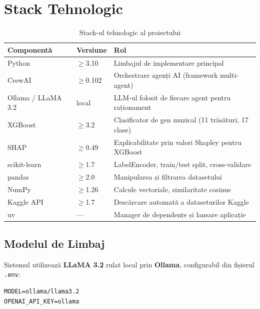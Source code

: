 \documentclass[12pt,a4paper]{report}
\begin{document}
\chapter{Stack Tehnologic}

\begin{table}[H]
\centering
\renewcommand{\arraystretch}{1.3}
\begin{tabularx}{\textwidth}{@{}llX@{}}
\toprule
\textbf{Componentă} & \textbf{Versiune} & \textbf{Rol} \\
\midrule
Python          & $\geq$3.10   & Limbajul de implementare principal \\
CrewAI          & $\geq$0.102  & Orchestrare agenți AI (framework multi-agent) \\
Ollama / LLaMA 3.2 & local     & LLM-ul folosit de fiecare agent pentru raționament \\
XGBoost         & $\geq$3.2    & Clasificator de gen muzical (11 trăsături, 17 clase) \\
SHAP            & $\geq$0.49   & Explicabilitate prin valori Shapley pentru XGBoost \\
scikit-learn    & $\geq$1.7    & LabelEncoder, train/test split, cross-validare \\
pandas          & $\geq$2.0    & Manipularea și filtrarea datasetului \\
NumPy           & $\geq$1.26   & Calcule vectoriale, similaritate cosinus \\
Kaggle API      & $\geq$1.7    & Descărcare automată a dataseturilor Kaggle \\
uv              & —            & Manager de dependențe și lansare aplicație \\
\bottomrule
\end{tabularx}
\caption{Stack-ul tehnologic al proiectului}
\label{tab:techstack}
\end{table}

\section{Modelul de Limbaj}

Sistemul utilizează \textbf{LLaMA 3.2} rulat local prin \textbf{Ollama},
configurabil din fișierul \texttt{.env}:

\begin{lstlisting}[style=yaml, caption={Configurare model LLM (.env)}]
MODEL=ollama/llama3.2
OPENAI_API_KEY=ollama
\end{lstlisting}
\end{document}
